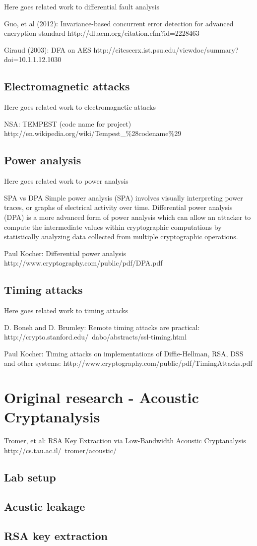 Here goes related work to differential fault analysis

Guo, et al (2012): Invariance-based concurrent error detection for advanced encryption standard
http://dl.acm.org/citation.cfm?id=2228463

Giraud (2003): DFA on AES
http://citeseerx.ist.psu.edu/viewdoc/summary?doi=10.1.1.12.1030

\subsection{Electromagnetic attacks}\label{sec:electromagnetic_attacks}

Here goes related work to electromagnetic attacks

NSA: TEMPEST (code name for project)
http://en.wikipedia.org/wiki/Tempest\_\%28codename\%29

\subsection{Power analysis}\label{sec:power_analysis}

Here goes related work to power analysis

SPA vs DPA
Simple power analysis (SPA) involves visually interpreting power traces, or graphs of electrical activity over time. 
Differential power analysis (DPA) is a more advanced form of power analysis which can allow an attacker to compute the intermediate values within cryptographic computations by statistically analyzing data collected from multiple cryptographic operations.

Paul Kocher: Differential power analysis
http://www.cryptography.com/public/pdf/DPA.pdf
\subsection{Timing attacks}\label{sec:timing_attacks}

Here goes related work to timing attacks

D. Boneh and D. Brumley: Remote timing attacks are practical:
http://crypto.stanford.edu/~dabo/abstracts/ssl-timing.html

Paul Kocher: Timing attacks on implementations of Diffie-Hellman, RSA, DSS and other systems:
http://www.cryptography.com/public/pdf/TimingAttacks.pdf

\section{Original research - Acoustic Cryptanalysis}\label{sec:original_research}

Tromer, et al: RSA Key Extraction via Low-Bandwidth Acoustic Cryptanalysis
http://cs.tau.ac.il/~tromer/acoustic/

\subsection{Lab setup}\label{sec:lab_setup}
\subsection{Acustic leakage}\label{sec:acustic_leakage}
\subsection{RSA key extraction}\label{sec:rsa_key_extraction}
